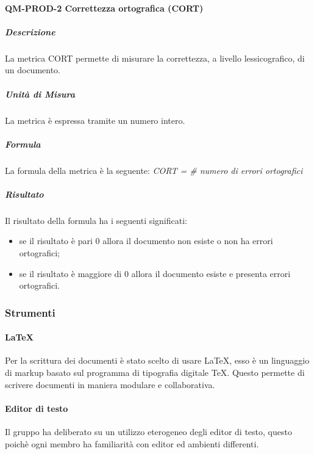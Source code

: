 			\paragraph{QM-PROD-2 Correttezza ortografica (CORT)}
				\subparagraph{Descrizione}
					La metrica CORT permette di misurare la correttezza, a livello lessicografico, di un documento.
				\subparagraph{Unità di Misura}
					La metrica è espressa tramite un numero intero.
				\subparagraph{Formula}
					La formula della metrica è la seguente:
					\textit{CORT = \# numero di errori ortografici}
				\subparagraph{Risultato}
					Il risultato della formula ha i seguenti significati:
					\begin{itemize}
						\item se il risultato è pari 0 allora il documento non esiste o non ha errori ortografici;
						\item se il risultato è maggiore di 0 allora il documento esiste e presenta errori ortografici.
					\end{itemize}
		
		\subsubsection{Strumenti}
			\paragraph{LaTeX}
				Per la scrittura dei documenti è stato scelto di usare \LaTeX{}, esso è un linguaggio di markup basato sul programma di tipografia digitale \TeX{}. Questo permette di scrivere documenti in maniera modulare e collaborativa.
			\paragraph{Editor di testo}
				Il gruppo ha deliberato su un utilizzo eterogeneo degli editor di testo, questo poichè ogni membro ha familiarità con editor ed ambienti differenti.
